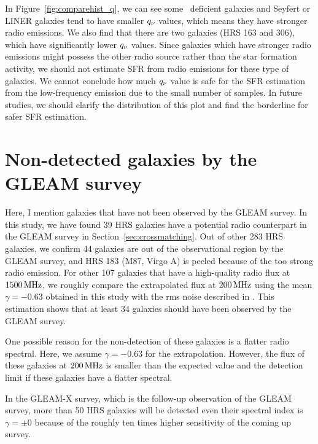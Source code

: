 In Figure~\ref{fig:comparehist_q}, we can see some \nh~deficient galaxies and Seyfert or LINER galaxies tend to have smaller $q_{\nu}$ values, which means they have stronger radio emissions.
We also find that there are two galaxies (HRS 163 and 306), which have significantly lower $q_{\nu}$ values.
Since galaxies which have stronger radio emissions might possess the other radio source rather than the star formation activity, we should not estimate SFR from radio emissions for these type of galaxies.
We cannot conclude how much $q_{\nu}$ value is safe for the SFR estimation from the low-frequency emission due to the small number of samples.
In future studies, we should clarify the distribution of this plot and find the borderline for safer SFR estimation.


\section{Non-detected galaxies by the GLEAM survey}\label{sec:nondetectedgalaxiesbythegleamsurvey}

Here, I mention galaxies that have not been observed by the GLEAM survey.
In this study, we have found 39 HRS galaxies have a potential radio counterpart in the GLEAM survey in Section~\ref{sec:crossmatching}.
Out of other 283 HRS galaxies, we confirm 44 galaxies are out of the observational region by the GLEAM survey, and HRS 183 (M87, Virgo A) is peeled because of the too strong radio emission.
For other 107 galaxies that have a high-quality radio flux at $1500\,\mathrm{MHz}$, we roughly compare the extrapolated flux at $200\,\mathrm{MHz}$ using the mean $\gamma = -0.63$ obtained in this study with the rms noise described in \citet{Hurley-Walker2017a}.
This estimation shows that at least 34 galaxies should have been observed by the GLEAM survey.

One possible reason for the non-detection of these galaxies is a flatter radio spectral.
Here, we assume $\gamma = -0.63$ for the extrapolation.
However, the flux of these galaxies at $200\,\mathrm{MHz}$ is smaller than the expected value and the detection limit if these galaxies have a flatter spectral.

In the GLEAM-X survey, which is the follow-up observation of the GLEAM survey, more than 50 HRS galaxies will be detected even their spectral index is $\gamma = \pm 0$ because of the roughly ten times higher sensitivity of the coming up survey.



%
%
